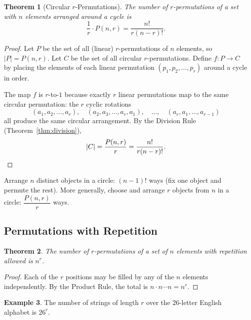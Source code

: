 \documentclass[11pt, a4paper, notitlepage]{report}
\newtheorem{theorem}{Theorem}[section]
\theoremstyle{definition}
\newtheorem{example}[theorem]{Example}
\theoremstyle{remark}
\begin{document}
\begin{theorem}[Circular $r$-Permutations]
\label{thm:cycleperm}
The number of $r$-permutations of a set with $n$ elements arranged around a cycle is
\[
  \frac{1}{r}\cdot P(n,r) = \frac{n!}{r(n-r)!}.
\]
\end{theorem}

\begin{proof}
Let $P$ be the set of all (linear) $r$-permutations of $n$ elements, so $|P| = P(n,r)$.
Let $C$ be the set of all circular $r$-permutations.  Define $f : P \to C$ by placing the
elements of each linear permutation $(p_1, p_2, \ldots, p_r)$ around a cycle in order.

The map $f$ is $r$-to-$1$ because exactly $r$ linear permutations map to the same circular
permutation: the $r$ cyclic rotations
\[
  (a_1,a_2,\ldots,a_r),\quad (a_2,a_3,\ldots,a_r,a_1),\quad \ldots,\quad (a_r,a_1,\ldots,a_{r-1})
\]
all produce the same circular arrangement.  By the Division Rule (Theorem~\ref{thm:division}),
\[
  |C| = \frac{P(n,r)}{r} = \frac{n!}{r(n-r)!}. \qedhere
\]
\end{proof}

\begin{keyresult}[title={Key Result: Circular Permutations}]
Arrange $n$ distinct objects in a circle: $(n-1)!$ ways (fix one object and permute the rest).
More generally, choose and arrange $r$ objects from $n$ in a circle: $\dfrac{P(n,r)}{r}$ ways.
\end{keyresult}

\subsection{Permutations with Repetition}

\begin{theorem}
\label{thm:permrep}
The number of $r$-permutations of a set of $n$ elements \emph{with repetition allowed} is $n^r$.
\end{theorem}

\begin{proof}
Each of the $r$ positions may be filled by any of the $n$ elements independently.  By the
Product Rule, the total is $n \cdot n \cdots n = n^r$.
\end{proof}

\begin{example}
The number of strings of length $r$ over the $26$-letter English alphabet is $26^r$.
\end{example}
\end{document}
